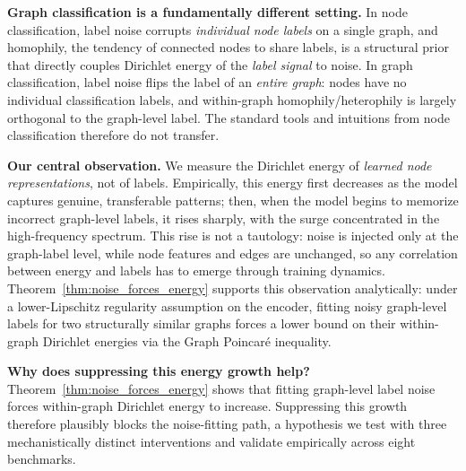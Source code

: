 \documentclass{article}
\theoremstyle{definition}
\begin{document}
\textbf{Graph classification is a fundamentally different setting.} In node classification, label noise corrupts \emph{individual node labels} on a single graph, and homophily, the tendency of connected nodes to share labels, is a structural prior that directly couples Dirichlet energy of the \emph{label signal} to noise. In graph classification, label noise flips the label of an \emph{entire graph}: nodes have no individual classification labels, and within-graph homophily/heterophily is largely orthogonal to the graph-level label. The standard tools and intuitions from node classification therefore do not transfer.

\textbf{Our central observation.} We measure the Dirichlet energy of \emph{learned node representations}, not of labels. Empirically, this energy first decreases as the model captures genuine, transferable patterns; then, when the model begins to memorize incorrect graph-level labels, it rises sharply, with the surge concentrated in the high-frequency spectrum. This rise is not a tautology: noise is injected only at the graph-label level, while node features and edges are unchanged, so any correlation between energy and labels has to emerge through training dynamics. Theorem~\ref{thm:noise_forces_energy} supports this observation analytically: under a lower-Lipschitz regularity assumption on the encoder, fitting noisy graph-level labels for two structurally similar graphs forces a lower bound on their within-graph Dirichlet energies via the Graph Poincar\'e inequality.

\textbf{Why does suppressing this energy growth help?} Theorem~\ref{thm:noise_forces_energy} shows that fitting graph-level label noise forces within-graph Dirichlet energy to increase. Suppressing this growth therefore plausibly blocks the noise-fitting path, a hypothesis we test with three mechanistically distinct interventions and validate empirically across eight benchmarks.
\end{document}

